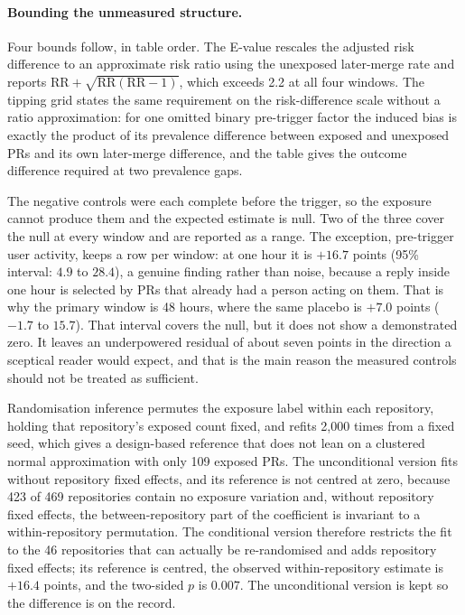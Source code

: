 \documentclass[pdflatex,sn-basic]{sn-jnl}
\begin{document}
\paragraph{Bounding the unmeasured structure.} Four bounds follow, in table
order. The E-value rescales the adjusted risk difference to an approximate risk
ratio using the unexposed later-merge rate and reports
$\mathrm{RR}+\sqrt{\mathrm{RR}(\mathrm{RR}-1)}$, which exceeds 2.2 at all four
windows. The tipping grid states the same requirement on the risk-difference
scale without a ratio approximation: for one omitted binary pre-trigger factor
the induced bias is exactly the product of its prevalence difference between
exposed and unexposed PRs and its own later-merge difference, and the table
gives the outcome difference required at two prevalence gaps.

The negative controls were each complete before the trigger, so the exposure
cannot produce them and the expected estimate is null. Two of the three cover
the null at every window and are reported as a range. The exception, pre-trigger
user activity, keeps a row per window: at one hour it is $+16.7$ points (95\%
interval: $4.9$ to $28.4$), a genuine finding rather than noise, because a reply
inside one hour is selected by PRs that already had a person acting on them.
That is why the primary window is 48 hours, where the same placebo is $+7.0$
points ($-1.7$ to $15.7$). That interval covers the null, but it does not show a
demonstrated zero. It leaves an underpowered residual of about seven points in
the direction a sceptical reader would expect, and that is the main reason the
measured controls should not be treated as sufficient.

Randomisation inference permutes the exposure label within each repository,
holding that repository's exposed count fixed, and refits 2,000 times from a
fixed seed, which gives a design-based reference that does not lean on a
clustered normal approximation with only 109 exposed PRs. The unconditional
version fits without repository fixed effects, and its reference is not centred
at zero, because 423 of 469 repositories contain no exposure variation and, without
repository fixed effects, the between-repository part of the coefficient is
invariant to a within-repository permutation. The conditional version therefore
restricts the fit to the 46 repositories that can actually be re-randomised and
adds repository fixed effects; its reference is centred, the observed
within-repository estimate is $+16.4$ points, and the two-sided $p$ is $0.007$.
The unconditional version is kept so the difference is on the record.
\end{document}
